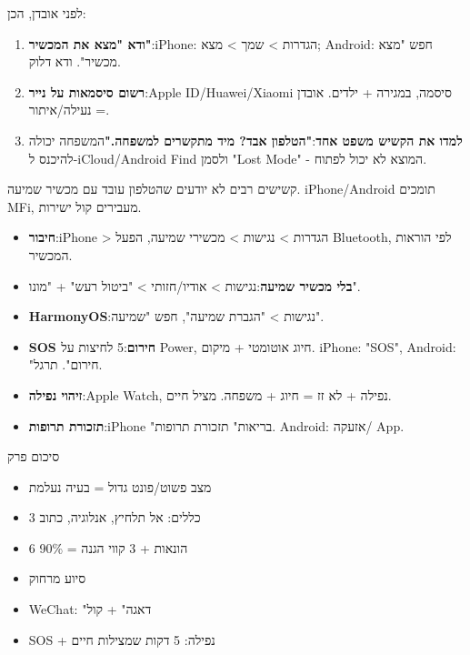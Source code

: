 
לפני אובדן, הכן:

\begin{enumerate}
  \item \textbf{ודא "מצא את המכשיר"}:iPhone: הגדרות > שמך > מצא; Android: חפש "מצא מכשיר". ודא דלוק.
  \item \textbf{רשום סיסמאות על נייר}:Apple ID/Huawei/Xiaomi סיסמה, במגירה + ילדים. אובדן = נעילה/איתור.
  \item \textbf{למדו את הקשיש משפט אחד}:\textbf{"הטלפון אבד? מיד מתקשרים למשפחה."}המשפחה יכולה להיכנס ל-iCloud/Android Find ולסמן "Lost Mode" - המוצא לא יכול לפתוח.
\end{enumerate}


קשישים רבים לא יודעים שהטלפון עובד עם מכשיר שמיעה. iPhone/Android תומכים MFi, מעבירים קול ישירות.

\begin{itemize}
  \item \textbf{חיבור}:iPhone > הגדרות > נגישות > מכשירי שמיעה, הפעל Bluetooth, לפי הוראות המכשיר.
  \item \textbf{בלי מכשיר שמיעה}:נגישות > אודיו/חזותי > "ביטול רעש" + "מונו".
  \item \textbf{HarmonyOS}:נגישות > "הגברת שמיעה", חפש "שמיעה".
\end{itemize}


\begin{itemize}
  \item \textbf{SOS חירום}:5 לחיצות על Power, חיוג אוטומטי + מיקום. iPhone: "SOS", Android: "חירום". תרגל.
  \item \textbf{זיהוי נפילה}:Apple Watch, נפילה + לא זז = חיוג + משפחה. מציל חיים.
  \item \textbf{תזכורת תרופות}:iPhone "בריאות" תזכורת תרופות. Android: אזעקה/ App.
\end{itemize}

\begin{tcbsummary}{סיכום פרק}
\begin{itemize}
  \item מצב פשוט/פונט גדול = בעיה נעלמת
  \item 3 כללים: אל תלחיץ, אנלוגיה, כתוב
  \item 6 הונאות + 3 קווי הגנה = 90\%
  \item סיוע מרחוק
  \item WeChat: "דאגה" + קול
  \item SOS + נפילה: 5 דקות שמצילות חיים
\end{itemize}

\end{tcbsummary}
